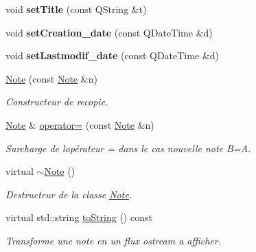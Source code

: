 \begin{DoxyCompactItemize}
\item 
\mbox{\label{class_note_a7a9ca310664f058b56ccc33005688e25}} 
void {\bfseries set\+Title} (const Q\+String \&t)
\item 
\mbox{\label{class_note_ab83acc1404775a43af17a31edeaae246}} 
void {\bfseries set\+Creation\+\_\+date} (const Q\+Date\+Time \&d)
\item 
\mbox{\label{class_note_a2cb5616e643b49316bd95e9a2b958e44}} 
void {\bfseries set\+Lastmodif\+\_\+date} (const Q\+Date\+Time \&d)
\item 
\hyperlink{class_note_ac06fd282c05bbfe2e1675fe0677b2efb}{Note} (const \hyperlink{class_note}{Note} \&n)
\begin{DoxyCompactList}\small\item\em Constructeur de recopie. \end{DoxyCompactList}\item 
\mbox{\label{class_note_ac9b2b6b880bd4c01738ee43bde04b7e5}} 
\hyperlink{class_note}{Note} \& \hyperlink{class_note_ac9b2b6b880bd4c01738ee43bde04b7e5}{operator=} (const \hyperlink{class_note}{Note} \&n)
\begin{DoxyCompactList}\small\item\em Surcharge de l\textquotesingle{}opérateur = dans le cas nouvelle note B=A. \end{DoxyCompactList}\item 
\mbox{\label{class_note_ade484273015c82e7fa59a028de0d8818}} 
virtual \hyperlink{class_note_ade484273015c82e7fa59a028de0d8818}{$\sim$\+Note} ()
\begin{DoxyCompactList}\small\item\em Destructeur de la classe \hyperlink{class_note}{Note}. \end{DoxyCompactList}\item 
virtual std\+::string \hyperlink{class_note_a1bd4acfbde0b71d05fd7d4ca889bca2b}{to\+String} () const
\begin{DoxyCompactList}\small\item\em Transforme une note en un flux ostream a afficher. \end{DoxyCompactList}\item 
\mbox{\label{class_note_a00684fea94bcdcf16f9d40a9d7a8dd5b}} 

\end{DoxyCompactItemize}
